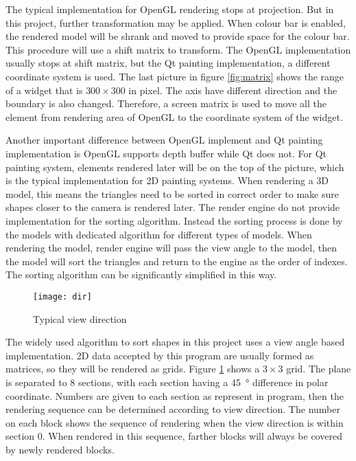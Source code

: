 The typical implementation for OpenGL rendering stops at projection. But in this project, further transformation may be applied. When colour bar is enabled, the rendered model will be shrank and moved to provide space for the colour bar. This procedure will use a shift matrix to transform. The OpenGL implementation usually stops at shift matrix, but the Qt painting implementation, a different coordinate system is used. The last picture in figure \ref{fig:matrix} shows the range of a widget that is $300\times300$ in pixel. The axis have different direction and the boundary is also changed. Therefore, a screen matrix is used to move all the element from rendering area of OpenGL to the coordinate system of the widget.

Another important difference between OpenGL implement and Qt painting implementation is OpenGL supports depth buffer while Qt does not. For Qt painting system, elements rendered later will be on the top of the picture, which is the typical implementation for 2D painting systems. When rendering a 3D model, this means the triangles need to be sorted in correct order to make sure shapes closer to the camera is rendered later. The render engine do not provide implementation for the sorting algorithm. Instead the sorting process is done by the models with dedicated algorithm for different types of models. When rendering the model, render engine will pass the view angle to the model, then the model will sort the triangles and return to the engine as the order of indexes. The sorting algorithm can be significantly simplified in this way.

\begin{figure}[!htb]
	\centering
	\texttt{[image: dir]}
	\caption{Typical view direction}
	\label{fig:dir}
\end{figure}

The widely used algorithm to sort shapes in this project uses a view angle based implementation. 2D data accepted by this program are usually formed as matrices, so they will be rendered as grids. Figure \ref{fig:dir} shows a $3\times3$ grid. The plane is separated to 8 sections, with each section having a \SI{45}{\degree} difference in polar coordinate. Numbers are given to each section as represent in program, then the rendering sequence can be determined according to view direction. The number on each block shows the sequence of rendering when the view direction is within section 0. When rendered in this sequence, farther blocks will always be covered by newly rendered blocks.

